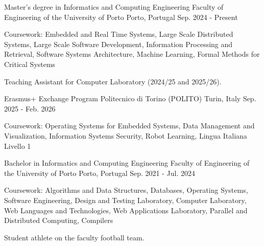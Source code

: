 
\begin{cventries}

  \cventry
    {Master's degree in Informatics and Computing Engineering \href{https://sigarra.up.pt/feup/en/cur_geral.cur_planos_estudos_view?pv_plano_id=31204&pv_ano_lectivo=2025&pv_tipo_cur_sigla=}{\faLink}} 
    {Faculty of Engineering of the University of Porto }
    {Porto, Portugal}
    {Sep. 2024 - Present}
    {
      \begin{cvitems}
        \item {Coursework: Embedded and Real Time Systems, Large Scale Distributed Systems, Large Scale Software Development, Information Processing and Retrieval, Software Systems Architecture, Machine Learning, Formal Methods for Critical Systems}
        \item {Teaching Assistant for Computer Laboratory (2024/25 and 2025/26).}
      \end{cvitems}
    }

  \cventry
    {Erasmus+ Exchange Program}
    {Politecnico di Torino (POLITO) \href{https://www.polito.it/}{\faLink}}
    {Turin, Italy}
    {Sep. 2025 - Feb. 2026}
    {
      \begin{cvitems}
        \item {Coursework: Operating Systems for Embedded Systems, Data Management and Visualization, Information Systems Security, Robot Learning, Lingua Italiana Livello 1}
      \end{cvitems}
    }

  \cventry
    {Bachelor in Informatics and Computing Engineering \href{https://sigarra.up.pt/feup/en/CUR_GERAL.CUR_PLANOS_ESTUDOS_VIEW?pv_plano_id=31224&pv_ano_lectivo=2023&pv_tipo_cur_sigla=&pv_origem=CUR}{\faLink}}
    {Faculty of Engineering of the University of Porto}
    {Porto, Portugal}
    {Sep. 2021 - Jul. 2024} 
    {
      \begin{cvitems}
        \item {Coursework: Algorithms and Data Structures, Databases, Operating Systems, Software Engineering, Design and Testing Laboratory, Computer Laboratory, Web Languages and Technologies, Web Applications Laboratory, Parallel and Distributed Computing, Compilers}
        \item {Student athlete on the faculty football team.}
      \end{cvitems}
    }

\end{cventries}
